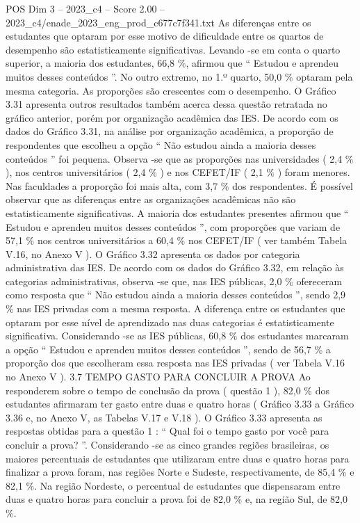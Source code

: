 \begin{textsample}{POS Dim 3 – 2023\_c4 – Score 2.00 – 2023\_c4/enade\_2023\_eng\_prod\_c677c7f341.txt}
As diferenças entre os estudantes que optaram por esse motivo de dificuldade entre os quartos de desempenho são estatisticamente significativas.
Levando -se em conta o quarto superior, a maioria dos estudantes, 66,8 \%, afirmou que “ Estudou e aprendeu muitos desses conteúdos ”.
No outro extremo, no 1.º quarto, 50,0 \% optaram pela mesma categoria.
As proporções são crescentes com o desempenho.
O Gráfico 3.31 apresenta outros resultados também acerca dessa questão retratada no gráfico anterior, porém por organização acadêmica das IES.
De acordo com os dados do Gráfico 3.31, na análise por organização acadêmica, a proporção de respondentes que escolheu a opção “ Não estudou ainda a maioria desses conteúdos ” foi pequena.
Observa -se que as proporções nas universidades ( 2,4 \% ), nos centros universitários ( 2,4 \% ) e nos CEFET/IF ( 2,1 \% ) foram menores.
Nas faculdades a proporção foi mais alta, com 3,7 \% dos respondentes.
É possível observar que as diferenças entre as organizações acadêmicas não são estatisticamente significativas.
A maioria dos estudantes presentes afirmou que “ Estudou e aprendeu muitos desses conteúdos ”, com proporções que variam de 57,1 \% nos centros universitários a 60,4 \% nos CEFET/IF ( ver também Tabela V.16, no Anexo V ).
O Gráfico 3.32 apresenta os dados por categoria administrativa das IES.
De acordo com os dados do Gráfico 3.32, em relação às categorias administrativas, observa -se que, nas IES públicas, 2,0 \% ofereceram como resposta que “ Não estudou ainda a maioria desses conteúdos ”, sendo 2,9 \% nas IES privadas com a mesma resposta.
A diferença entre os estudantes que optaram por esse nível de aprendizado nas duas categorias é estatisticamente significativa.
Considerando -se as IES públicas, 60,8 \% dos estudantes marcaram a opção “ Estudou e aprendeu muitos desses conteúdos ”, sendo de 56,7 \% a proporção dos que escolheram essa resposta nas IES privadas ( ver Tabela V.16 no Anexo V ). 3.7 TEMPO GASTO PARA CONCLUIR A PROVA Ao responderem sobre o tempo de conclusão da prova ( questão 1 ), 82,0 \% dos estudantes afirmaram ter gasto entre duas e quatro horas ( Gráfico 3.33 a Gráfico 3.36 e, no Anexo V, as Tabelas V.17 e V.18 ).
O Gráfico 3.33 apresenta as respostas obtidas para a questão 1 : “ Qual foi o tempo gasto por você para concluir a prova? ”.
Considerando -se as cinco grandes regiões brasileiras, os maiores percentuais de estudantes que utilizaram entre duas e quatro horas para finalizar a prova foram, nas regiões Norte e Sudeste, respectivamente, de 85,4 \% e 82,1 \%.
Na região Nordeste, o percentual de estudantes que dispensaram entre duas e quatro horas para concluir a prova foi de 82,0 \% e, na região Sul, de 82,0 \%.

\end{textsample}
